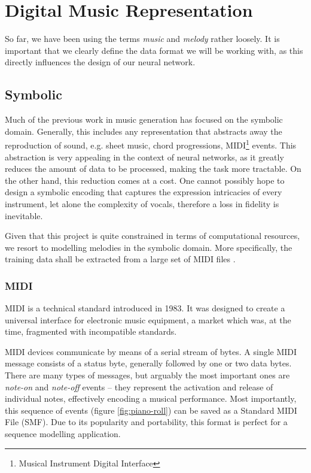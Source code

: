\documentclass[../../report.tex]{subfiles}
\begin{document}
\section{Digital Music Representation}

So far, we have been using the terms \emph{music} and \emph{melody} rather
loosely. It is important that we clearly define the data format we will be
working with, as this directly influences the design of our neural network.

\subsection{Symbolic}

Much of the previous work in music generation has focused on the symbolic
domain. Generally, this includes any representation that abstracts away the
reproduction of sound, e.g. sheet music, chord progressions,
MIDI\footnote{Musical Instrument Digital Interface} events. This abstraction is
very appealing in the context of neural networks, as it greatly reduces the
amount of data to be processed, making the task more tractable. On the other
hand, this reduction comes at a cost. One cannot possibly hope to design a
symbolic encoding that captures the expression intricacies of every instrument,
let alone the complexity of vocals, therefore a loss in fidelity is inevitable.
\cite{Dieleman2020}

Given that this project is quite constrained in terms of computational
resources, we resort to modelling melodies in the symbolic domain. More
specifically, the training data shall be extracted from a large set of MIDI
files .

\subsubsection{MIDI}
MIDI is a technical standard introduced in 1983. It was designed to create a
universal interface for electronic music equipment, a market which was, at the
time, fragmented with incompatible standards.

MIDI devices communicate by means of a serial stream of bytes. A single MIDI
message consists of a status byte, generally followed by one or two data bytes.
There are many types of messages, but arguably the most important ones are
\emph{note-on} and \emph{note-off} events -- they represent the activation and
release of individual notes, effectively encoding a musical performance. Most
importantly, this sequence of events (figure \ref{fig:piano-roll}) can be saved
as a Standard MIDI File (SMF). Due to its popularity and portability, this
format is perfect for a sequence modelling application. \cite{MIDI2015Messages,
MIDI2015Files}
\end{document}
